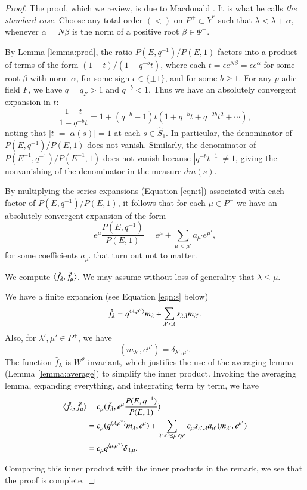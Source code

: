 \begin{proof}  
  The proof, which we review, is due to Macdonald
  \cite[Ch.V]{macdonaldspherical}.  It is what he calls {\it the
    standard case}.  Choose any total order $(<)$ on $P^+\subset Y^*$
  such that $\lambda < \lambda + \alpha$, whenever $\alpha = N\beta$
  is the norm of a positive root $\beta\in\Psi^+$.

  By Lemma \ref{lemma:prod}, the ratio $P(E,q^{-1})/P(E,1)$ factors
  into a product of terms of the form $(1- t)/(1- q^{-b} t)$, where
  each $t = \epsilon e^{N\beta} = \epsilon e^\alpha$ for some root
  $\beta$ with norm $\alpha$, for some sign $\epsilon\in \{\pm 1\}$,
  and for some $b\ge 1$.  For any $p$-adic field $F$, we have $q = q_F
  > 1$ and $q^{-b} < 1$.  Thus we have an absolutely convergent
  expansion in $t$:
\begin{equation}\label{eqn:t}
\frac{1- t}{1- q^{-b} t} = 1 + (q^{-b}-1) t (1+ q^{-b} t + q^{-2b} t^2 + \cdots),
\end{equation}
noting that $|t| = |\alpha(s)|=1$ at each $s\in \hat S_1$.  In
particular, the denominator of $P(E,q^{-1})/P(E,1)$ does not vanish.
Similarly, the denominator of $P(E^{-1},q^{-1})/P(E^{-1},1)$ does not
vanish because $|q^{-b} t^{-1}|\ne1$, giving the nonvanishing of the
denominator in the measure $dm(s)$.

By multiplying the series expansions (Equation \ref{eqn:t}) associated
with each factor of $P(E,q^{-1})/P(E,1)$, it follows that for each
$\mu\in P^+$ we have an absolutely convergent expansion of the form
\[
e^\mu \frac{P(E,q^{-1})}{P(E,1)} = e^\mu +\sum_{\mu< \mu'} a_{\mu'} e^{\mu'},
\] 
for some coefficients $a_{\mu'}$ that turn out not to matter.

We compute $\langle{\hat f_\lambda,\hat f_\mu}\rangle$.  We may assume without
loss of generality that $\lambda \le \mu$.


We have a finite expansion (see Equation \ref{eqn:s} below)
\[
\hat f_\lambda = q^{\langle{\lambda,\rho^\vee}\rangle} m_\lambda 
+ \sum_{\lambda' <\lambda } s_{\lambda\,\lambda} m_{\lambda'}.
\]
Also, for $\lambda',\mu'\in P^+$, we have
\[
(m_{\lambda'},e^{\mu'}) = \delta_{\lambda',{\mu'}}.
\]
The function $\hat f_\lambda$ is $W^\theta$-invariant, which justifies
the use of the averaging lemma (Lemma \ref{lemma:average}) to simplify
the inner product.  Invoking the averaging lemma, expanding
everything, and integrating term by term, we have
\begin{align*}
\langle{\hat f_\lambda,\hat f_\mu}\rangle 
&= c_\mu (\hat f_\lambda, e^\mu \frac{ P(E,q^{-1})}{P(E,1)})\\
&= c_\mu (q^{\langle{\lambda,\rho^\vee}\rangle} m_\lambda,e^\mu) 
+ \sum_{\lambda' < \lambda\le\mu < \mu'}
c_\mu s_{\lambda',\lambda} a_{\mu'} (m_{\lambda'},e^{\mu'})\\ 
&= c_\mu q^{\langle{\mu,\rho^\vee}\rangle} \delta_{\lambda,\mu}.
\end{align*}

Comparing this inner product with the inner products in the remark, we
see that the proof is complete.
\end{proof}

